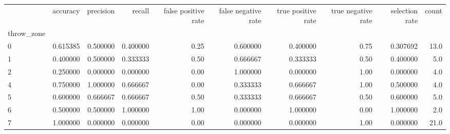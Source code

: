 \begin{tabular}{lrrrrrrrrr}
\toprule
{} &  accuracy &  precision &    recall &  false positive rate &  false negative rate &  true positive rate &  true negative rate &  selection rate &  count \\
throw\_zone &           &            &           &                      &                      &                     &                     &                 &        \\
\midrule
0          &  0.615385 &   0.500000 &  0.400000 &                 0.25 &             0.600000 &            0.400000 &                0.75 &        0.307692 &   13.0 \\
1          &  0.400000 &   0.500000 &  0.333333 &                 0.50 &             0.666667 &            0.333333 &                0.50 &        0.400000 &    5.0 \\
2          &  0.250000 &   0.000000 &  0.000000 &                 0.00 &             1.000000 &            0.000000 &                1.00 &        0.000000 &    4.0 \\
4          &  0.750000 &   1.000000 &  0.666667 &                 0.00 &             0.333333 &            0.666667 &                1.00 &        0.500000 &    4.0 \\
5          &  0.600000 &   0.666667 &  0.666667 &                 0.50 &             0.333333 &            0.666667 &                0.50 &        0.600000 &    5.0 \\
6          &  0.500000 &   0.500000 &  1.000000 &                 1.00 &             0.000000 &            1.000000 &                0.00 &        1.000000 &    2.0 \\
7          &  1.000000 &   0.000000 &  0.000000 &                 0.00 &             0.000000 &            0.000000 &                1.00 &        0.000000 &   21.0 \\
\bottomrule
\end{tabular}
